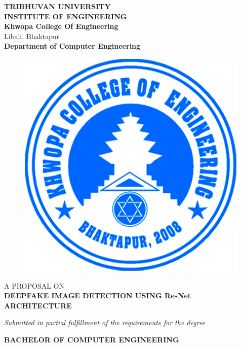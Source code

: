     \begin{center}
		\thispagestyle{empty}
		\Large\textbf{TRIBHUVAN UNIVERSITY}\\
		\Large\textbf{INSTITUTE OF ENGINEERING }\\
		\vspace{0.2in}
		\large{\textbf{Khwopa College Of Engineering}\\}
		\normalsize{Libali, Bhaktapur\\}
		\large\textbf{Department of Computer Engineering}
		\vspace{0.2in}
		\begin{figure}[h]
		    \centering
			    \includegraphics{img/Khwopalogo.jpg}
		\end{figure}
		
		\vspace{0.2in}
		\large{A PROPOSAL ON\\\textbf{DEEPFAKE IMAGE  DETECTION USING ResNet ARCHITECTURE}\\}
	
		\vspace{0.2in}
		\large{\textit{Submitted in partial fulfillment of the requirements for the degree\\}}
		
		\vspace{0.2in}
		\large{\textbf{BACHELOR OF COMPUTER ENGINEERING}\\}
		

\end{center}
